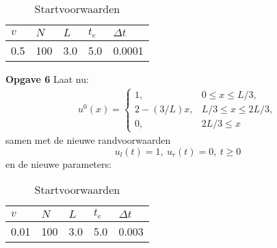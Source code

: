\documentclass{article}
\newcommand{\Dt}{\Delta t}
\begin{document}
\begin{table}[h!]
\centering

\label{tab:specs}
\begin{tabular}{|l|l|l|l|l|}
\hline
\(v\) & \(N\) & \(L\) & \(t_e\) & \(\Dt\) \\ \hline
 0.5 & 100 & 3.0 & 5.0 & 0.0001 \\ \hline
\end{tabular}
\caption{Startvoorwaarden}
\end{table}
\textbf{Opgave 6}
Laat nu: 
\begin{align*}
	u^0(x) =\begin{cases}
	1, & 0\leq x \leq L/3,\\
	2-(3/L)x, & L/3 \leq x\leq 2L/3,\\
	0, & 2L/3 \leq x
	\end{cases}
\end{align*}
samen met de nieuwe randvoorwaarden 
\[u_l(t)=1,~u_r(t)=0,~t\geq 0\]
en de nieuwe parameters:
\begin{table}[h!]
\centering

\label{tab:specs2}
\begin{tabular}{|l|l|l|l|l|}
\hline
\(v\) & \(N\) & \(L\) & \(t_e\) & \(\Dt\) \\ \hline
 0.01 & 100 & 3.0 & 5.0 & 0.003 \\ \hline
\end{tabular}
\caption{Startvoorwaarden}
\end{table}
\end{document}
